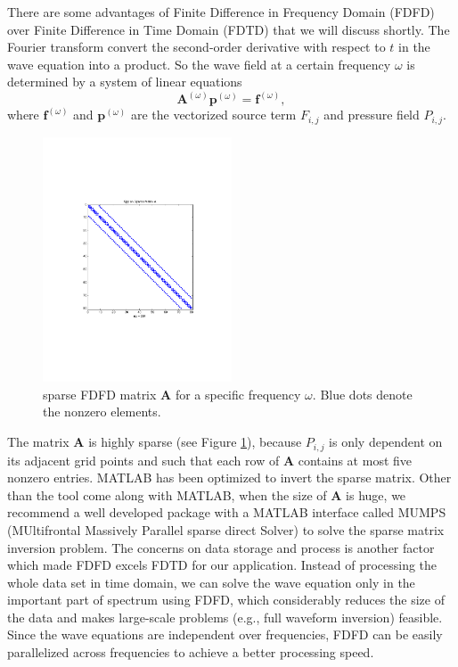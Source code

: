 \documentclass[11pt,titlepage]{article}
\newcommand{\bA}{\boldsymbol{A}}
\newcommand{\bff}{\boldsymbol{f}}
\newcommand{\bp}{\boldsymbol{p}}
\theoremstyle{plain}
\theoremstyle{definition}
\theoremstyle{remark}
\numberwithin{equation}{section}
\begin{document}
There are some advantages of Finite Difference in Frequency Domain (FDFD) over Finite Difference in Time Domain (FDTD) that we will discuss shortly. The Fourier transform convert the second-order derivative with respect to $t$ in the wave equation into a product. So the wave field at a certain frequency $\omega$ is determined by a system of linear equations 
\begin{equation}\label{eq:awFreq}
\bA^{(\omega)}\bp^{(\omega)} = \bff^{(\omega)},
\end{equation}
where $\bff^{(\omega)}$ and $\bp^{(\omega)}$ are the vectorized source term $F_{i,j}$ and pressure field $P_{i,j}$.
 \begin{figure}[htbp]
\centering
\includegraphics[width=0.5\textwidth]{Fig/FDFDMatrixA.pdf}
\caption{sparse FDFD matrix $\bA$ for a specific frequency $\omega$. Blue dots denote the nonzero elements.}
\label{fig:SparseA}
\end{figure}

The matrix $\bA$ is highly sparse (see Figure \ref{fig:SparseA}), because $P_{i,j}$ is only dependent on its adjacent grid points and such that each row of $\bA$ contains at most five nonzero entries. MATLAB has been optimized to invert the sparse matrix. Other than the tool come along with MATLAB, when the size of $\bA$ is huge, we recommend a well developed package with a MATLAB interface called MUMPS (MUltifrontal Massively Parallel sparse direct Solver) to solve the sparse matrix inversion problem. The concerns on data storage and process is another factor which made FDFD excels FDTD for our application. Instead of processing the whole data set in time domain, we can solve the wave equation only in the important part of spectrum using FDFD, which considerably reduces the size of the data and makes large-scale problems (e.g., full waveform inversion) feasible. Since the wave equations are independent over frequencies, FDFD can be easily parallelized across frequencies to achieve a better processing speed.
\end{document}
